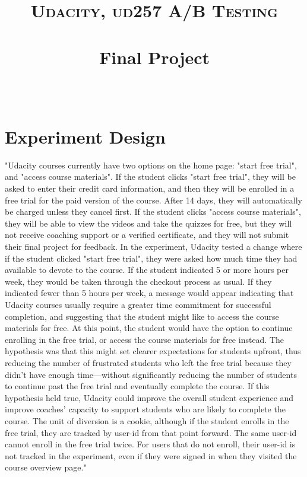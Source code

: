 \documentclass[paper=a4, fontsize=11pt]{scrartcl} %
\title{	
\normalfont \normalsize 
\textsc{Udacity, ud257 A/B Testing} \\ [25pt] %
\horrule{0.5pt} \\[0.4cm] %
\huge Final Project \\ %
\horrule{2pt} \\[0.5cm] %
}
\numberwithin{equation}{section} %
\numberwithin{figure}{section} %
\numberwithin{table}{section} %
\begin{document}
\maketitle %


\section{Experiment Design}

"Udacity courses currently have two options on the home page: "start free trial", and "access course materials". If the student clicks "start free trial", they will be asked to enter their credit card information, and then they will be enrolled in a free trial for the paid version of the course. After 14 days, they will automatically be charged unless they cancel first. If the student clicks "access course materials", they will be able to view the videos and take the quizzes for free, but they will not receive coaching support or a verified certificate, and they will not submit their final project for feedback.
\newline \newline
In the experiment, Udacity tested a change where if the student clicked "start free trial", they were asked how much time they had available to devote to the course. If the student indicated 5 or more hours per week, they would be taken through the checkout process as usual. If they indicated fewer than 5 hours per week, a message would appear indicating that Udacity courses usually require a greater time commitment for successful completion, and suggesting that the student might like to access the course materials for free. At this point, the student would have the option to continue enrolling in the free trial, or access the course materials for free instead.
\newline \newline
The hypothesis was that this might set clearer expectations for students upfront, thus reducing the number of frustrated students who left the free trial because they didn't have enough time—without significantly reducing the number of students to continue past the free trial and eventually complete the course. If this hypothesis held true, Udacity could improve the overall student experience and improve coaches' capacity to support students who are likely to complete the course.
The unit of diversion is a cookie, although if the student enrolls in the free trial, they are tracked by user-id from that point forward. The same user-id cannot enroll in the free trial twice. For users that do not enroll, their user-id is not tracked in the experiment, even if they were signed in when they visited the course overview page."
\end{document}
